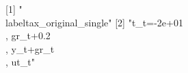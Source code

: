 [1] "\\label{tax_original_single}"                                  
[2] "{t_{t}}=-2e+01\\, {gr_{t}}+0.2\\, {y_{t}}+{gr_{t}}\\, {ut_{t}}"
